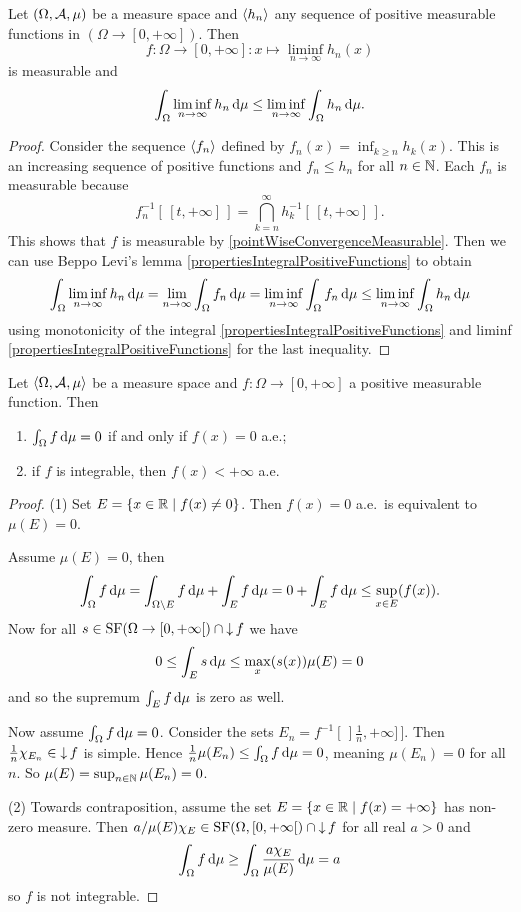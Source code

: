 \begin{proposition} \label{FatouLemma}
Let $\left( \Omega, \mathcal{A}, \mu \right)$ be a measure space and $\left\langle h_n \right\rangle$ any sequence of positive measurable functions in $(\Omega\to[0,+\infty])$. Then
\[ f: \Omega\to[0,+\infty]: x\mapsto \liminf_{n\to\infty}h_n(x) \]
is measurable and
\[ \int_\Omega \liminf_{n\to\infty}h_n\operatorname{d \!}{\mu} \leq \liminf_{n\to\infty}\int_\Omega h_n\operatorname{d \!}{\mu}. \]
\end{proposition}
\begin{proof}
Consider the sequence $\left\langle f_n \right\rangle$ defined by $f_n(x) = \inf_{k\geq n}h_k(x)$. This is an increasing sequence of positive functions and $f_n \leq h_n$ for all $n\in\mathbb{N}$. Each $f_n$ is measurable because
\[ f_n^{-1}[\,[t,+\infty]\,] = \bigcap_{k=n}^\infty h_k^{-1}[\,[t,+\infty]\,]. \]
This shows that $f$ is measurable by \ref{pointWiseConvergenceMeasurable}. Then we can use Beppo Levi's lemma \ref{propertiesIntegralPositiveFunctions} to obtain
\[ \int_\Omega\liminf_{n\to\infty}h_n\operatorname{d \!}{\mu} = \lim_{n\to\infty}\int_\Omega f_n\operatorname{d \!}{\mu} = \liminf_{n\to\infty}\int_\Omega f_n\operatorname{d \!}{\mu} \leq \liminf_{n\to\infty}\int_\Omega h_n\operatorname{d \!}{\mu} \]
using monotonicity of the integral \ref{propertiesIntegralPositiveFunctions} and liminf \ref{propertiesIntegralPositiveFunctions} for the last inequality.
\end{proof}

\begin{proposition} \label{functionPropertiesFromIntegral}
Let $\left\langle \Omega, \mathcal{A}, \mu \right\rangle$ be a measure space and $f:\Omega\to[0,+\infty]$ a positive measurable function. Then
\begin{enumerate}
\item $\int_\Omega f\operatorname{d \!}{\mu} = 0$ \textup{if and only if} $f(x) = 0$ a.e.;
\item if $f$ is integrable, then $f(x)< +\infty$ a.e.\
\end{enumerate}
\end{proposition}
\begin{proof}(1) Set $E = \left\{ x\in\mathbb{R} \;\middle|\; f(x) \neq 0 \right\}$. Then $f(x) = 0$ a.e.\ is equivalent to $\mu(E) = 0$.

Assume $\mu(E) = 0$, then 
\[ \int_\Omega f\operatorname{d \!}{\mu} = \int_{\Omega\setminus E} f\operatorname{d \!}{\mu} + \int_E f\operatorname{d \!}{\mu} = 0+\int_E f\operatorname{d \!}{\mu} \leq \sup_{x\in E}(f(x)). \]
Now for all $s\in\operatorname{SF}(\Omega\to [0,+\infty[)\cap \operatorname{\downarrow} f$ we have
\[ 0\leq \int_E s \operatorname{d \!}{\mu}\leq \max_x(s(x))\mu(E) = 0  \]
and so the supremum $\int_E f\operatorname{d \!}{\mu}$ is zero as well.

Now assume $\int_\Omega f\operatorname{d \!}{\mu} = 0$. Consider the sets $E_n = f^{-1}[\,]\frac{1}{n},+\infty]\,]$. Then $\frac{1}{n}\chi_{E_n}\in \operatorname{\downarrow} f$ is simple. Hence $\frac{1}{n}\mu(E_n)\leq \int_\Omega f\operatorname{d \!}{\mu} = 0$, meaning $\mu(E_n) = 0$ for all $n$. So $\mu(E) = \sup_{n\in\mathbb{N}}\mu(E_n) = 0$.

(2) Towards contraposition, assume the set $E = \left\{ x\in\mathbb{R} \;\middle|\; f(x) = +\infty \right\}$ has non-zero measure. Then $a/\mu(E)\chi_E\in\operatorname{SF}(\Omega, [0,+\infty[)\cap \operatorname{\downarrow} f$ for all real $a>0$ and
\[  \int_\Omega f\operatorname{d \!}{\mu} \geq \int_\Omega \frac{a\chi_E}{\mu(E)}\operatorname{d \!}{\mu} = a  \]
so $f$ is not integrable.
\end{proof}

